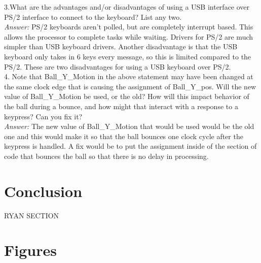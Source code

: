 \documentclass[journal, twocolumn, final,11pt,letterpaper]{IEEEtran}
\begin{document}
3.What are the advantages and/or disadvantages of using a USB interface over PS/2 interface to connect to the keyboard? List any two. \\

\textit{Answer:} PS/2 keyboards aren't polled, but are completely interrupt based. This allows the processor to complete tasks while waiting. Drivers for PS/2 are much simpler than USB keyboard drivers. Another disadvantage is that the USB keyboard only takes in 6 keys every message, so this is limited compared to the PS/2. These are two disadvantages for using a USB keyboard over PS/2.\\

4.  Note that Ball\_Y\_Motion in the above statement may have been changed at the same clock edge that is causing the assignment of Ball\_Y\_pos.  Will the new value of Ball\_Y\_Motion be used, or the old?  How will this impact behavior of the ball during a bounce, and how might that interact with a response to a keypress?  Can you fix it?\\

\textit{Answer:} The new value of Ball\_Y\_Motion that would be used would be the old one and this would make it so that the ball bounces one clock cycle after the keypress is handled. A fix would be to put the assignment inside of the section of code that bounces the ball so that there is no delay in processing. \\

\section{Conclusion}
RYAN SECTION

\clearpage
\onecolumn
\section{Figures}
\end{document}
